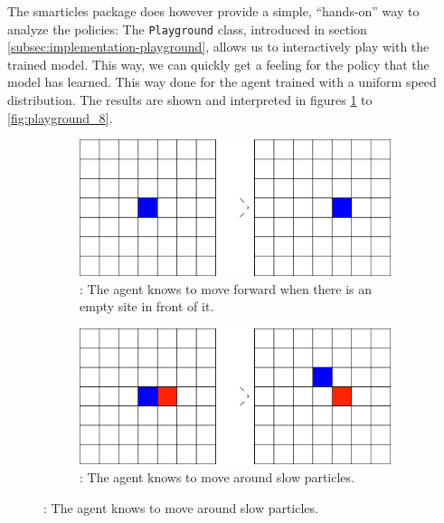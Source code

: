 The smarticles package does however provide a simple, \enquote{hands-on} way to analyze the policies: The \texttt{Playground} class, introduced in section \ref{subsec:implementation-playground}, allows us to interactively play with the trained model. This way, we can quickly get a feeling for the policy that the model has learned. This way done for the agent trained with a uniform speed distribution. The results are shown and interpreted in figures \ref{fig:playground_1} to \ref{fig:playground_8}. 

\newcommand\newsubcap[1]{\phantomcaption%
       \caption*{\thefigure\thesubfigure: #1}}

\begin{figure}[H]
        \begin{subfigure}[T]{0.45\textwidth}
            \centering
            \includegraphics[width=\textwidth]{playground/1.png}
            \newsubcap{The agent knows to move forward when there is an empty site in front of it.}
            \label{fig:playground_1}    
        \end{subfigure}
        \hfill
        \begin{subfigure}[T]{0.45\textwidth}
            \centering
            \includegraphics[width=\textwidth]{playground/2.png}
            \newsubcap{The agent knows to move around slow particles.}
            \label{fig:playground_2}
        \end{subfigure}
\end{figure}

